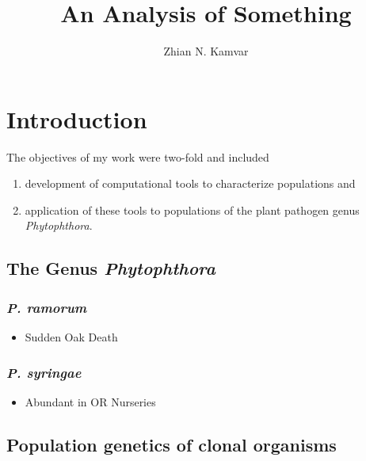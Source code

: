 \documentclass[double,12pt]{beavtex}
\title{An Analysis of Something} %
\author{Zhian N. Kamvar} %
\providecommand{\tightlist}{%
  \setlength{\itemsep}{0pt}\setlength{\parskip}{0pt}}
\begin{document}
\maketitle
\mainmatter


  \chapter{Introduction}\label{introduction}
  
  The objectives of my work were two-fold and included
  
  \begin{enumerate}
  \def\labelenumi{\arabic{enumi}.}
  \tightlist
  \item
    development of computational tools to characterize populations and
  \item
    application of these tools to populations of the plant pathogen genus
    \emph{Phytophthora}.
  \end{enumerate}
  
  \section{\texorpdfstring{The Genus
  \emph{Phytophthora}}{The Genus Phytophthora}}\label{the-genus-phytophthora}
  
  \subsection{\texorpdfstring{\emph{P.
  ramorum}}{P. ramorum}}\label{p.-ramorum}
  
  \begin{itemize}
  \tightlist
  \item
    Sudden Oak Death
  \end{itemize}
  
  \subsection{\texorpdfstring{\emph{P.
  syringae}}{P. syringae}}\label{p.-syringae}
  
  \begin{itemize}
  \tightlist
  \item
    Abundant in OR Nurseries
  \end{itemize}
  
  \section{Population genetics of clonal
  organisms}\label{population-genetics-of-clonal-organisms}
  
\end{document}
